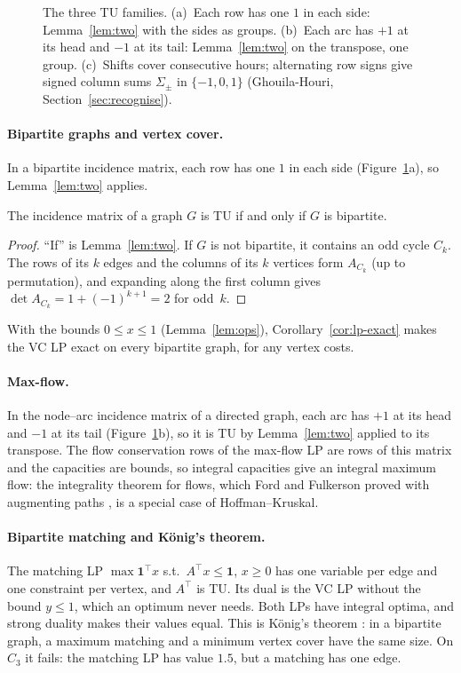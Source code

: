 \begin{figure}[H]
  \centering\small
  
  \caption{The three TU families. (a)~Each row has one $1$ in each side: Lemma~\ref{lem:two} with the sides as groups. (b)~Each arc has $+1$ at its head and $-1$ at its tail: Lemma~\ref{lem:two} on the transpose, one group. (c)~Shifts cover consecutive hours; alternating row signs give signed column sums $\Sigma_\pm$ in $\{-1,0,1\}$ (Ghouila-Houri, Section~\ref{sec:recognise}).}
  \label{fig:families}
\end{figure}

\paragraph{Bipartite graphs and vertex cover.} In a bipartite incidence matrix, each row has one $1$ in each side (Figure~\ref{fig:families}a), so Lemma~\ref{lem:two} applies.

\begin{theorem}\label{thm:bip}
  The incidence matrix of a graph $G$ is TU if and only if $G$ is bipartite.
\end{theorem}
\begin{proof}
  ``If'' is Lemma~\ref{lem:two}. If $G$ is not bipartite, it contains an odd cycle $C_k$. The rows of its $k$ edges and the columns of its $k$ vertices form $A_{C_k}$ (up to permutation), and expanding along the first column gives $\det A_{C_k} = 1 + (-1)^{k+1} = 2$ for odd~$k$.
\end{proof}

With the bounds $0\le x\le 1$ (Lemma~\ref{lem:ops}), Corollary~\ref{cor:lp-exact} makes the VC LP exact on every bipartite graph, for any vertex costs.

\paragraph{Max-flow.} In the node--arc incidence matrix of a directed graph, each arc has $+1$ at its head and $-1$ at its tail (Figure~\ref{fig:families}b), so it is TU by Lemma~\ref{lem:two} applied to its transpose. The flow conservation rows of the max-flow LP are rows of this matrix and the capacities are bounds, so integral capacities give an integral maximum flow: the integrality theorem for flows, which Ford and Fulkerson proved with augmenting paths \cite{fordfulkerson1957}, is a special case of Hoffman--Kruskal.

\paragraph{Bipartite matching and König's theorem.} The matching LP $\max \mathbf 1^\top x$ s.t.\ $A^\top x\le \mathbf 1$, $x\ge 0$ has one variable per edge and one constraint per vertex, and $A^\top$ is TU. Its dual is the VC LP without the bound $y\le 1$, which an optimum never needs. Both LPs have integral optima, and strong duality makes their values equal. This is König's theorem \cite{konig1931}: in a bipartite graph, a maximum matching and a minimum vertex cover have the same size. On $C_3$ it fails: the matching LP has value $1.5$, but a matching has one edge.

